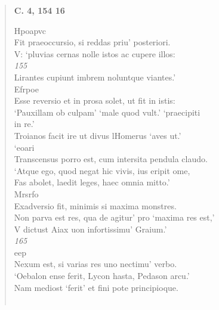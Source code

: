 \documentclass[11pt, a4paper]{report}
\begin{document}
\begin{verse}
     \marginpar{[18]} \begin{center} \textbf{C. 4, 154 16} \end{center}Hpoapvc \\ Fit praeoccursio, si reddas priu’ posteriori. \\ V: ‘pluvias cernas nolle istos ac cupere illos: \\ \textit{155} \\ Lirantes cupiunt imbrem noluntque viantes.’ \\ Efrpoe \\ Esse reversio et in prosa solet, ut fit in istis: \\ ‘Pauxillam ob culpam’ ‘male quod vult.’ ‘praecipiti \\ in re.’ \\ Troianos facit ire ut divus lHomerus ‘aves ut.’ \\ ‘eoari \\ Transcensus porro est, cum intersita pendula claudo. \\ ‘Atque ego, quod negat hic vivis, ius eripit ome, \\ Fas abolet, laedit leges, haec omnia mitto.’ \\ Mrsrfo \\ Exadversio fit, minimis si maxima monstres. \\ Non parva est res, qua de agitur’ pro ‘maxima res est,’ \\ V dictust Aiax uon infortissimu’ Graium.’ \\ \textit{165} \\ eep \\ Nexum est, si varias res uno nectimu’ verbo. \\ ‘Oebalon ense ferit, Lycon hasta, Pedason arcu.’ \\ Nam mediost ‘ferit’ et fini pote principioque. \\ 
        ﻿\pagebreak 

\end{verse}
\end{document}
